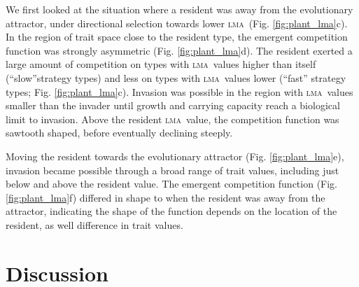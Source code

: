 \documentclass[a4paper,11pt]{article}
\newcommand{\lma}{\textsc{lma}}
\begin{document}
We first looked at the situation where a resident was away from the
evolutionary attractor, under directional selection towards lower \lma\ (Fig. \ref{fig:plant_lma}c). In the region of trait space close to the resident type, the emergent competition function was strongly asymmetric (Fig. \ref{fig:plant_lma}d). The resident exerted a large amount of competition on types with \lma\ values higher than itself (``slow''strategy types) and less on types with \lma\ values lower (``fast'' strategy types; Fig. \ref{fig:plant_lma}c). Invasion was possible in the region with \lma\ values smaller than the invader until growth and carrying capacity reach a biological limit to invasion. Above the resident \lma\ value, the competition function was sawtooth shaped, before eventually declining steeply.

Moving the resident towards the evolutionary attractor (Fig. \ref{fig:plant_lma}e), invasion became possible through a broad range of trait values, including just below and above the resident value. The emergent competition function (Fig. \ref{fig:plant_lma}f) differed in shape to when the resident was away from the attractor, indicating the shape of the function depends on the location of the resident, as well difference in trait values.

\section{Discussion}
\end{document}
